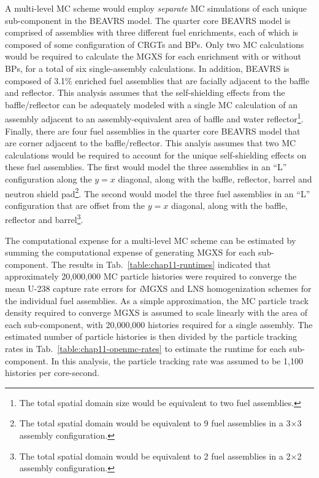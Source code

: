 A multi-level \ac{MC} scheme would employ \textit{separate} \ac{MC} simulations of each unique sub-component in the \ac{BEAVRS} model. The quarter core \ac{BEAVRS} model is comprised of assemblies with three different fuel enrichments, each of which is composed of some configuration of \acp{CRGT} and \acp{BP}. Only two \ac{MC} calculations would be required to calculate the \ac{MGXS} for each enrichment with or without \acp{BP}, for a total of six single-assembly calculations. In addition, \ac{BEAVRS} is composed of 3.1\% enriched fuel assemblies that are facially adjacent to the baffle and reflector. This analysis assumes that the self-shielding effects from the baffle/reflector can be adequately modeled with a single \ac{MC} calculation of an assembly adjacent to an assembly-equivalent area of baffle and water reflector\footnote{The total spatial domain size would be equivalent to two fuel assemblies.}. Finally, there are four fuel assemblies in the quarter core \ac{BEAVRS} model that are corner adjacent to the baffle/reflector. This analyis assumes that two \ac{MC} calculations would be required to account for the unique self-shielding effects on these fuel assemblies. The first would model the three assemblies in an ``L'' configuration along the $y = x$ diagonal, along with the baffle, reflector, barrel and neutron shield pad\footnote{The total spatial domain would be equivalent to 9 fuel assemblies in a 3$\times$3 assembly configuration.}. The second would model the three fuel assemblies in an ``L'' configuration that are offset from the $y = x$ diagonal, along with the baffle, reflector and barrel\footnote{The total spatial domain would be equivalent to 2 fuel assemblies in a 2$\times$2 assembly configuration.}.



The computational expense for a multi-level \ac{MC} scheme can be estimated by summing the computational expense of generating \ac{MGXS} for each sub-component. The results in Tab.~\ref{table:chap11-runtimes} indicated that approximately 20,000,000 \ac{MC} particle histories were required to converge the mean U-238 capture rate errors for \textit{i}\ac{MGXS} and \ac{LNS} homogenization schemes for the individual fuel assemblies. As a simple approximation, the \ac{MC} particle track density required to converge \ac{MGXS} is assumed to scale linearly with the area of each sub-component, with 20,000,000 histories required for a single assembly. The estimated number of particle histories is then divided by the particle tracking rates in Tab.~\ref{table:chap11-openmc-rates} to estimate the runtime for each sub-component. In this analysis, the particle tracking rate was assumed to be 1,100 histories per core-second.

